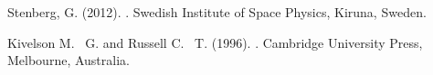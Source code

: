\documentclass{article}
\begin{document}

\begin{thebibliography}{9}

Stenberg, G.  (2012).
.
\newblock Swedish Institute of Space Physics, Kiruna, Sweden.

Kivelson M. ~G. and Russell C. ~T.  (1996).
.
\newblock Cambridge University Press, Melbourne, Australia.

\end{thebibliography}
\end{document}
